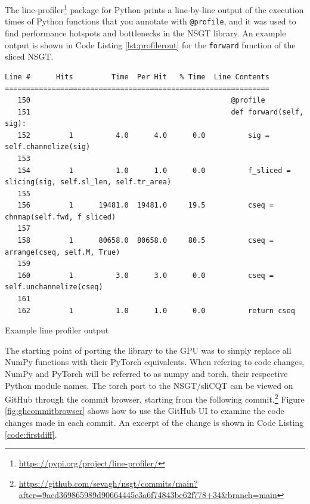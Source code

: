 \documentclass[report.tex]{subfiles}
\begin{document}
The line-profiler\footnote{\url{https://pypi.org/project/line-profiler/}} package for Python prints a line-by-line output of the execution times of Python functions that you annotate with \Verb#@profile#, and it was used to find performance hotspots and bottlenecks in the NSGT library. An example output is shown in Code Listing \ref{lst:profilerout} for the \Verb#forward# function of the sliced NSGT.

\begin{listing}[h]
  \centering
\begin{verbatim}
Line #      Hits         Time  Per Hit   % Time  Line Contents
==============================================================
   150                                               @profile
   151                                               def forward(self, sig):
   152         1          4.0      4.0      0.0          sig = self.channelize(sig)
   153
   154         1          1.0      1.0      0.0          f_sliced = slicing(sig, self.sl_len, self.tr_area)
   155
   156         1      19481.0  19481.0     19.5          cseq = chnmap(self.fwd, f_sliced)
   157
   158         1      80658.0  80658.0     80.5          cseq = arrange(cseq, self.M, True)
   159
   160         1          3.0      3.0      0.0          cseq = self.unchannelize(cseq)
   161
   162         1          1.0      1.0      0.0          return cseq
\end{verbatim}
  \caption{Example line profiler output}
  \label{lst:profilerout}
\end{listing}

The starting point of porting the library to the GPU was to simply replace all NumPy functions with their PyTorch equivalents. When refering to code changes, NumPy and PyTorch will be referred to as numpy and torch, their respective Python module names. The torch port to the NSGT/sliCQT can be viewed on GitHub through the commit browser, starting from the following commit.\footnote{\url{https://github.com/sevagh/nsgt/commits/main?after=9aed369865989d90664445c3a6f74843be62f778+34&branch=main}} Figure \ref{fig:ghcommitbrowser} shows how to use the GitHub UI to examine the code changes made in each commit. An excerpt of the change is shown in Code Listing \ref{code:firstdiff}.
\end{document}
